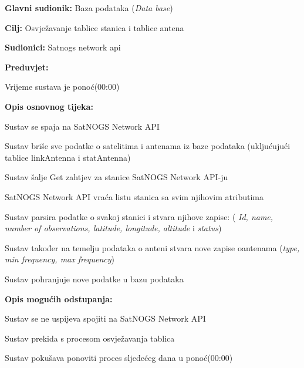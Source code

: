 		 
		
		
		
		\noindent {}
		\begin{packed_item}
			
			\item \textbf{Glavni sudionik: }Baza podataka (\textit{Data base})
			\item  \textbf{Cilj: }Osvježavanje tablice stanica i tablice antena
			\item  \textbf{Sudionici: }Satnogs network api
			\item  \textbf{Preduvjet: }
			\begin{packed_enum}
				\item Vrijeme sustava je ponoć(00:00)	\end{packed_enum}
			\item  \textbf{Opis osnovnog tijeka: }
			
			\item[] \begin{packed_enum}
				
				\item Sustav se spaja na SatNOGS Network API
				\item Sustav briše sve podatke o satelitima i antenama iz baze podataka \newline(ukljućujući tablice linkAntenna i statAntenna)
				\item Sustav šalje Get zahtjev za stanice SatNOGS Network API-ju
				\item SatNOGS Network API vraća listu stanica sa svim njihovim atributima
				\item Sustav parsira podatke o svakoj stanici i stvara njihove zapise: ( \textit{Id, name, number of observations, latitude, longitude, altitude} i \textit{status})
				\item Sustav također na temelju podataka o anteni stvara nove zapise o\newline antenama (\textit{type, min frequency, max frequency})
				\item Sustav pohranjuje nove podatke u bazu podataka
				
				
			\end{packed_enum}
			
			\item  \textbf{Opis mogućih odstupanja: }
			
			\item[] \begin{packed_enum}
				
				\item[1] Sustav se ne uspijeva spojiti na  SatNOGS Network API
				\item[ ] \begin{packed_enum}
					
					\item[1.1] Sustav prekida s procesom osvježavanja tablica
					\item[1.2] Sustav pokušava ponoviti proces sljedećeg dana u ponoć(00:00)
				\end{packed_enum}
			\end{packed_enum}
		\end{packed_item}
